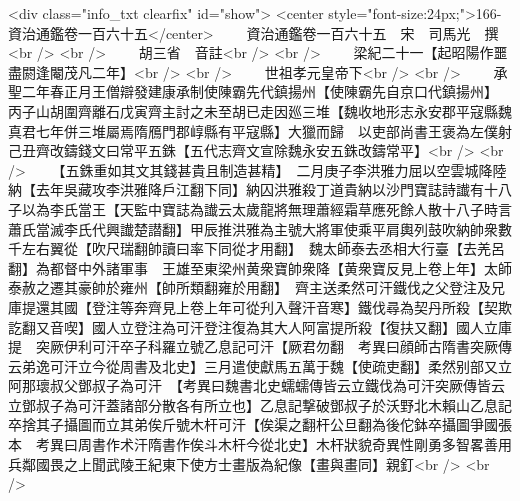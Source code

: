<div class="info_txt clearfix" id="show">
<center style="font-size:24px;">166-資治通鑑卷一百六十五</center>
  　　資治通鑑卷一百六十五　宋　司馬光　撰<br />
<br />
　　胡三省　音註<br />
<br />
　　梁紀二十一【起昭陽作噩盡閼逢閹茂凡二年】<br />
<br />
　　世祖孝元皇帝下<br />
<br />
　　承聖二年春正月王僧辯發建康承制使陳霸先代鎮揚州【使陳霸先自京口代鎮揚州】　丙子山胡圍齊離石戊寅齊主討之未至胡已走因廵三堆【魏收地形志永安郡平寇縣魏真君七年併三堆屬焉隋鴈門郡崞縣有平寇縣】大獵而歸　以吏部尚書王褒為左僕射己丑齊改鑄錢文曰常平五銖【五代志齊文宣除魏永安五銖改鑄常平】<br />
<br />
　　【五銖重如其文其錢甚貴且制造甚精】　二月庚子李洪雅力屈以空雲城降陸納【去年吳藏攻李洪雅降戶江翻下同】納囚洪雅殺丁道貴納以沙門寶誌詩䜟有十八子以為李氏當王【天監中寶誌為䜟云太歲龍將無理蕭經霜草應死餘人散十八子時言蕭氏當滅李氏代興䜟楚譛翻】甲辰推洪雅為主號大將軍使乘平肩輿列鼓吹納帥衆數千左右翼從【吹尺瑞翻帥讀曰率下同從才用翻】　魏太師泰去丞相大行臺【去羌呂翻】為都督中外諸軍事　王雄至東梁州黄衆寶帥衆降【黄衆寶反見上卷上年】太師泰赦之遷其豪帥於雍州【帥所類翻雍於用翻】　齊主送柔然可汗鐵伐之父登注及兄庫提還其國【登注等奔齊見上卷上年可從刋入聲汗音寒】鐵伐尋為契丹所殺【契欺訖翻又音喫】國人立登注為可汗登注復為其大人阿富提所殺【復扶又翻】國人立庫提　突厥伊利可汗卒子科羅立號乙息記可汗【厥君勿翻　考異曰顔師古隋書突厥傳云弟逸可汗立今從周書及北史】三月遣使獻馬五萬于魏【使疏吏翻】柔然别部又立阿那瓌叔父鄧叔子為可汗　【考異曰魏書北史蠕蠕傳皆云立鐵伐為可汗突厥傳皆云立鄧叔子為可汗蓋諸部分散各有所立也】乙息記撃破鄧叔子於沃野北木賴山乙息記卒捨其子攝圖而立其弟俟斤號木杆可汗【俟渠之翻杆公旦翻為後佗鉢卒攝圖爭國張本　考異曰周書作术汗隋書作俟斗木杆今從北史】木杆狀貌奇異性剛勇多智畧善用兵鄰國畏之上聞武陵王紀東下使方士畫版為紀像【畫與畫同】親釘<br />
<br />
